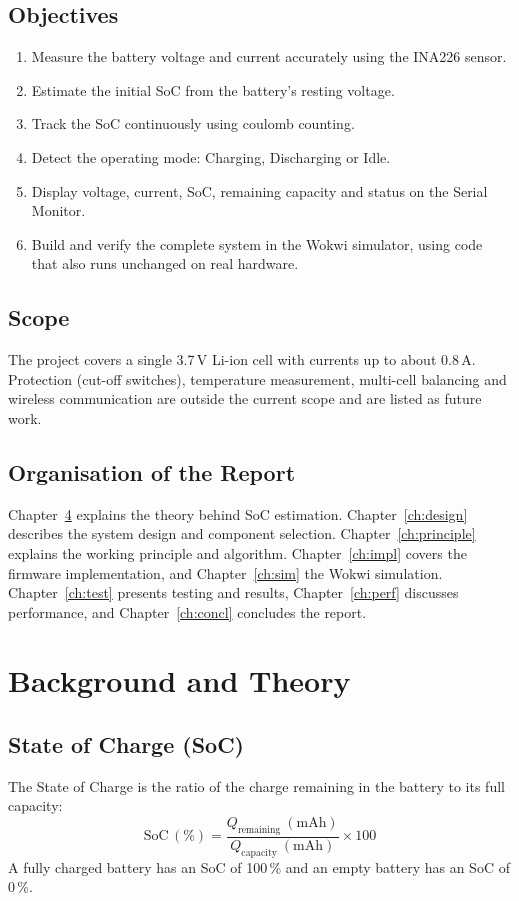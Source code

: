 \documentclass[12pt,a4paper,oneside]{report}
\begin{document}
\section{Objectives}
\begin{enumerate}
  \item Measure the battery voltage and current accurately using the INA226 sensor.
  \item Estimate the initial SoC from the battery's resting voltage.
  \item Track the SoC continuously using coulomb counting.
  \item Detect the operating mode: Charging, Discharging or Idle.
  \item Display voltage, current, SoC, remaining capacity and status on the Serial Monitor.
  \item Build and verify the complete system in the Wokwi simulator, using code that also runs unchanged on real hardware.
\end{enumerate}

\section{Scope}
The project covers a single 3.7\,V Li-ion cell with currents up to about 0.8\,A. Protection (cut-off switches), temperature measurement, multi-cell balancing and wireless communication are outside the current scope and are listed as future work.

\section{Organisation of the Report}
Chapter~\ref{ch:background} explains the theory behind SoC estimation. Chapter~\ref{ch:design} describes the system design and component selection. Chapter~\ref{ch:principle} explains the working principle and algorithm. Chapter~\ref{ch:impl} covers the firmware implementation, and Chapter~\ref{ch:sim} the Wokwi simulation. Chapter~\ref{ch:test} presents testing and results, Chapter~\ref{ch:perf} discusses performance, and Chapter~\ref{ch:concl} concludes the report.

\chapter{Background and Theory}\label{ch:background}

\section{State of Charge (SoC)}
The State of Charge is the ratio of the charge remaining in the battery to its full capacity:
\begin{equation}
  \text{SoC}\,(\%) = \frac{Q_{\text{remaining}}\ (\text{mAh})}{Q_{\text{capacity}}\ (\text{mAh})} \times 100
  \label{eq:soc}
\end{equation}
A fully charged battery has an SoC of 100\,\% and an empty battery has an SoC of 0\,\%.
\end{document}
